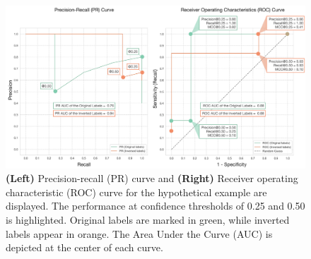 \begin{figure}[h]
    \centering
    \includegraphics[width=1\textwidth]{fig_s5_curve.jpg}
    \caption{\textbf{(Left)} Precision-recall (PR) curve and \textbf{(Right)} Receiver operating characteristic (ROC) curve for the hypothetical example are displayed. The performance at confidence thresholds of 0.25 and 0.50 is highlighted. Original labels are marked in green, while inverted labels appear in orange. The Area Under the Curve (AUC) is depicted at the center of each curve.}
    \label{fig:s5_curve}
\end{figure}

